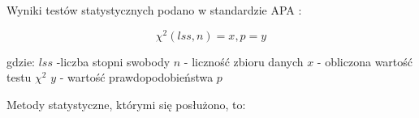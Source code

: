 \documentclass[a4paper,12pt,twoside,openright]{mwrep}
\begin{document}
Wyniki testów statystycznych podano w standardzie APA \cite{apa}:\newline

\begin{equation}
    \chi^2 (lss, n) = x, p=y
\end{equation}

\vspace{\baselineskip} 
gdzie:\newline
$lss$ -liczba stopni swobody\newline
$n$ - liczność zbioru danych\newline
$x$ - obliczona wartość testu $\chi^2$\newline
$y$ - wartość prawdopodobieństwa $p$\newline


Metody statystyczne, którymi się posłużono, to:
\end{document}
